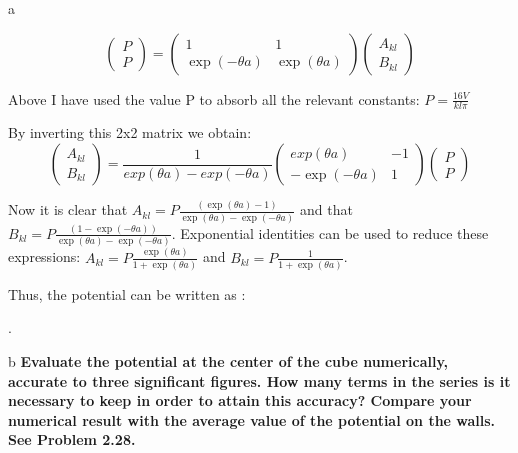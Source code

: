 \begin{homeworkProblem}[Jackson 3rd ed. : 2.23]
\begin{homeworkSection}{a}
\begin{center}
\[
\left( \begin{array}{c} P \\ P \end{array} \right) = 
\begin{pmatrix} 1 & 1 \\ \exp(-\theta a) & \exp(\theta a) \end{pmatrix}
\left( \begin{array}{c} A_{kl} \\ B_{kl} \end{array} \right)
\]

Above I have used the value P to absorb all the relevant constants: $P = \frac{16 V}{k l \pi}$

By inverting this 2x2 matrix we obtain:
\[
\left( \begin{array}{c} A_{kl} \\ B_{kl} \end{array} \right) = \frac{1}{exp(\theta a)-exp(-\theta a)}
\begin{pmatrix} exp(\theta a) & -1 \\ -\exp(-\theta a) & 1 \end{pmatrix}
\left( \begin{array}{c} P \\ P \end{array} \right)
\]

\end{center}

Now it is clear that $A_{kl} = P\frac{(\exp(\theta a) - 1)}{\exp(\theta a)-\exp(-\theta a)}$ and that $B_{kl} = P\frac{(1-\exp(-\theta a))}{\exp(\theta a)-\exp(-\theta a)}$. Exponential identities can be used to reduce these expressions: $A_{kl} = P\frac{\exp(\theta a)}{1+\exp(\theta a)}$ and $B_{kl} = P\frac{1}{1+\exp(\theta a)}$.

Thus, the potential can be written as : \\ \par \problemAnswer{\[ \Phi(x,y,z) = \sum\limits_{odd n} \sum\limits_{odd m} \frac{16 V}{n m \pi} \frac{1}{1+\exp(\theta a)} \sin(\frac{n \pi x}{a}) \sin(\frac{m \pi y}{a}) (\exp(\theta a)exp(-\theta z) + \exp(\theta z)) \]}.

\end{homeworkSection}

\begin{homeworkSection}{b}
\textbf{Evaluate the potential at the center of the cube numerically, accurate to three 
significant figures. How many terms in the series is it necessary to keep in 
order to attain this accuracy? Compare your numerical result with the average 
value of the potential on the walls. See Problem 2.28.}


\end{homeworkSection}
\end{homeworkProblem}
